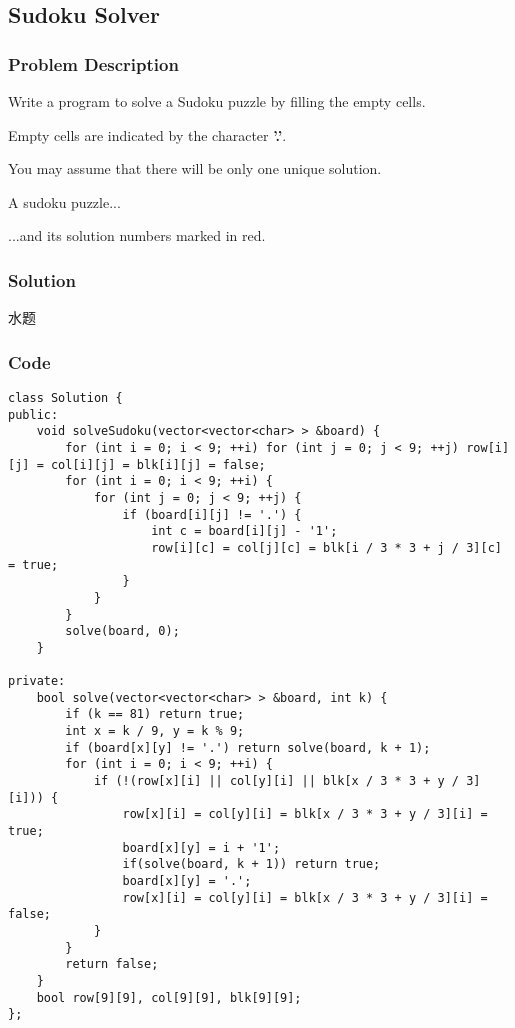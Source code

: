 \documentclass[courier]{article}
\begin{document}
\begin{CJK*}{UTF8}{gkai}
\subsection{ Sudoku Solver }

\subsubsection*{Problem Description}
Write a program to solve a Sudoku puzzle by filling the empty cells.

Empty cells are indicated by the character \textbf{'.'}.

You may assume that there will be only one unique solution.





A sudoku puzzle...

...and its solution numbers marked in red.



\subsubsection*{Solution}
水题

\subsubsection*{Code}
\begin{lstlisting}
class Solution {
public:
    void solveSudoku(vector<vector<char> > &board) {
        for (int i = 0; i < 9; ++i) for (int j = 0; j < 9; ++j) row[i][j] = col[i][j] = blk[i][j] = false;
        for (int i = 0; i < 9; ++i) {
            for (int j = 0; j < 9; ++j) {
                if (board[i][j] != '.') {
                    int c = board[i][j] - '1';
                    row[i][c] = col[j][c] = blk[i / 3 * 3 + j / 3][c] = true;
                }
            }
        }
        solve(board, 0);
    }
    
private:
    bool solve(vector<vector<char> > &board, int k) {
        if (k == 81) return true;
        int x = k / 9, y = k % 9;
        if (board[x][y] != '.') return solve(board, k + 1);
        for (int i = 0; i < 9; ++i) {
            if (!(row[x][i] || col[y][i] || blk[x / 3 * 3 + y / 3][i])) {
                row[x][i] = col[y][i] = blk[x / 3 * 3 + y / 3][i] = true;
                board[x][y] = i + '1';
                if(solve(board, k + 1)) return true;
                board[x][y] = '.';
                row[x][i] = col[y][i] = blk[x / 3 * 3 + y / 3][i] = false;
            }
        }
        return false;
    }
    bool row[9][9], col[9][9], blk[9][9];
}; 
\end{lstlisting}



\end{CJK*}
\end{document}
